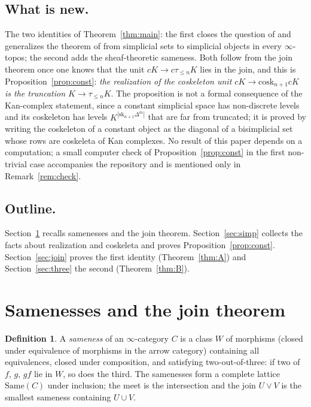 \documentclass[11pt]{amsart}
\theoremstyle{definition}
\newtheorem{defi}[thm]{Definition}
\newcommand{\Same}{\mathrm{Same}}
\newcommand{\cosk}{\mathrm{cosk}}
\newcommand{\sk}{\mathrm{sk}}
\newcommand{\tr}[1]{\tau_{\le #1}}
\begin{document}
\subsection*{What is new.}
The two identities of Theorem~\ref{thm:main}: the first closes the question
of \cite[\S8]{Topjoin} and generalizes the theorem of \cite{Postnikov} from
simplicial sets to simplicial objects in every $\infty$-topos; the second adds
the sheaf-theoretic sameness. Both follow from the join theorem once one
knows that the unit $cK\to c\tr nK$ lies in the join, and this is
Proposition~\ref{prop:const}: \emph{the realization of the coskeleton unit
$cK\to\cosk_{n+1}cK$ is the truncation $K\to\tr nK$}. The proposition is not
a formal consequence of the Kan-complex statement, since a constant
simplicial space has non-discrete levels and its coskeleton has levels
$K^{|\sk_{n+1}\Delta^m|}$ that are far from truncated; it is proved by
writing the coskeleton of a constant object as the diagonal of a bisimplicial
set whose rows are coskeleta of Kan complexes. No result of this paper
depends on a computation; a small computer check of Proposition~\ref{prop:const}
in the first non-trivial case accompanies the repository and is mentioned only in
Remark~\ref{rem:check}.

\subsection*{Outline.}
Section~\ref{sec:same} recalls samenesses and the join theorem.
Section~\ref{sec:simp} collects the facts about realization and coskeleta and
proves Proposition~\ref{prop:const}. Section~\ref{sec:join} proves the first
identity (Theorem~\ref{thm:A}) and Section~\ref{sec:three} the second
(Theorem~\ref{thm:B}).

\section{Samenesses and the join theorem}\label{sec:same}

\begin{defi}
A \emph{sameness} of an $\infty$-category $C$ is a class $W$ of morphisms
(closed under equivalence of morphisms in the arrow category) containing all
equivalences, closed under composition, and satisfying two-out-of-three: if two
of $f$, $g$, $gf$ lie in $W$, so does the third. The samenesses form a complete
lattice $\Same(C)$ under inclusion; the meet is the intersection and the join
$U\vee V$ is the smallest sameness containing $U\cup V$.
\end{defi}
\end{document}
